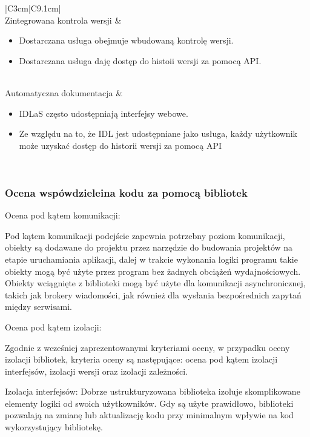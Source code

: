 \documentclass[runningheads,12pt]{llncs}
\begin{document}
\begin{longtable}{|C{3cm}|C{9.1cm}|}
     \\ \hline
    Zintegrowana kontrola wersji &
    \begin{itemize}
      \item Dostarczana usługa obejmuje wbudowaną kontrolę wersji.
      \item Dostarczana usługa daję dostęp do histoii wersji za pomocą API.
    \end{itemize} \\ \hline
    Automatyczna dokumentacja &
    \begin{itemize}
      \item IDLaS często udostępniają interfejsy webowe.
      \item Ze względu na to, że IDL jest udostępniane jako usługa, każdy użytkownik może uzyskać dostęp do historii wersji za pomocą API
    \end{itemize} \\ \hline

\end{longtable}

\subsubsection{Ocena wspówdzieleina kodu za pomocą bibliotek}

Ocena pod kątem komunikacji:

Pod kątem komunikacji podejście zapewnia potrzebny poziom komunikacji, obiekty są dodawane do projektu przez narzędzie do budowania projektów na etapie uruchamiania aplikacji, dalej w trakcie wykonania logiki programu takie obiekty mogą być użyte przez program bez żadnych obciążeń wydajnościowych. Obiekty wciągnięte z biblioteki mogą być użyte dla komunikacji asynchronicznej, takich jak brokery wiadomości, jak również dla wysłania bezpośrednich zapytań między serwisami.

Ocena pod kątem izolacji:

Zgodnie z wcześniej zaprezentowanymi kryteriami oceny, w przypadku oceny izolacji bibliotek, kryteria oceny są następujące: ocena pod kątem izolacji interfejsów, izolacji wersji oraz izolacji zależności.

Izolacja interfejsów: Dobrze ustrukturyzowana biblioteka izoluje skomplikowane elementy logiki od swoich użytkowników. Gdy są użyte prawidłowo, biblioteki pozwalają na zmianę lub aktualizację kodu przy minimalnym wpływie na kod wykorzystujący bibliotekę.  ~\cite[p. 75]{Essential}
\end{document}
